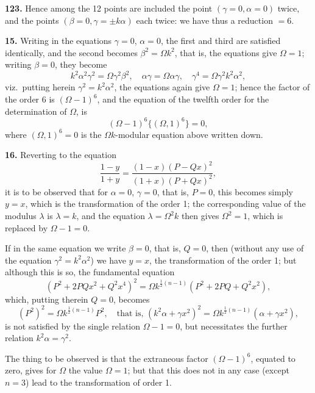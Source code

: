 \documentclass[11pt,a4paper]{article}
\theoremstyle{plain}
\begin{document}
\noindent\textbf{123.} Hence among the 12 points are included the point $(\gamma = 0, \alpha = 0)$ twice, and the points $(\beta = 0, \gamma = \pm k\alpha)$ each twice: we have thus a reduction $= 6$.

\medskip
\noindent\textbf{15.} Writing in the equations $\gamma = 0$, $\alpha = 0$, the first and third are satisfied identically, and the second becomes $\beta^2 = \Omega k^2$, that is, the equations give $\Omega = 1$; writing $\beta = 0$, they become
\[
k^2\alpha^2\gamma^2 = \Omega\gamma^2\beta^2, \quad \alpha\gamma = \Omega\alpha\gamma, \quad \gamma^4 = \Omega\gamma^2k^2\alpha^2,
\]
viz.\ putting herein $\gamma^2 = k^2\alpha^2$, the equations again give $\Omega = 1$; hence the factor of the order 6 is $(\Omega - 1)^6$, and the equation of the twelfth order for the determination of $\Omega$, is
\[
(\Omega - 1)^6\{ (\Omega, 1)^6 \} = 0,
\]
where $(\Omega, 1)^6 = 0$ is the $\Omega k$-modular equation above written down.

\medskip
\noindent\textbf{16.} Reverting to the equation
\[
\frac{1 - y}{1 + y} = \frac{(1 - x)(P - Qx)^2}{(1 + x)(P + Qx)^2},
\]
it is to be observed that for $\alpha = 0$, $\gamma = 0$, that is, $P = 0$, this becomes simply $y = x$, which is the transformation of the order 1; the corresponding value of the modulus $\lambda$ is $\lambda = k$, and the equation $\lambda = \Omega^2k$ then gives $\Omega^2 = 1$, which is replaced by $\Omega - 1 = 0$.

If in the same equation we write $\beta = 0$, that is, $Q = 0$, then (without any use of the equation $\gamma^2 = k^2\alpha^2$) we have $y = x$, the transformation of the order 1; but although this is so, the fundamental equation
\[
(P^2 + 2PQx^2 + Q^2x^4)^2 = \Omega k^{\frac{1}{2}(n-1)}(P^2 + 2PQ + Q^2x^2),
\]
which, putting therein $Q = 0$, becomes
\[
(P^2)^2 = \Omega k^{\frac{1}{2}(n-1)}P^2, \quad \text{that is, } (k^2\alpha + \gamma x^2)^2 = \Omega k^{\frac{1}{2}(n-1)}(\alpha + \gamma x^2),
\]
is not satisfied by the single relation $\Omega - 1 = 0$, but necessitates the further relation $k^2\alpha = \gamma^2$.

The thing to be observed is that the extraneous factor $(\Omega - 1)^6$, equated to zero, gives for $\Omega$ the value $\Omega = 1$; but that this does not in any case (except $n = 3$) lead to the transformation of order 1.
\end{document}
